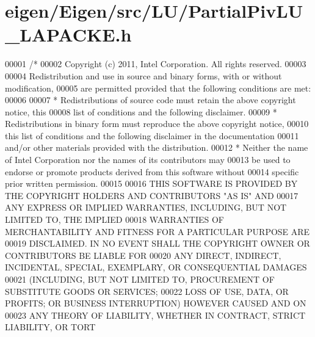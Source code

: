 \hypertarget{eigen_2_eigen_2src_2_l_u_2_partial_piv_l_u___l_a_p_a_c_k_e_8h_source}{}\section{eigen/\+Eigen/src/\+L\+U/\+Partial\+Piv\+L\+U\+\_\+\+L\+A\+P\+A\+C\+KE.h}
\label{eigen_2_eigen_2src_2_l_u_2_partial_piv_l_u___l_a_p_a_c_k_e_8h_source}

\begin{DoxyCode}
00001 \textcolor{comment}{/*}
00002 \textcolor{comment}{ Copyright (c) 2011, Intel Corporation. All rights reserved.}
00003 \textcolor{comment}{}
00004 \textcolor{comment}{ Redistribution and use in source and binary forms, with or without modification,}
00005 \textcolor{comment}{ are permitted provided that the following conditions are met:}
00006 \textcolor{comment}{}
00007 \textcolor{comment}{ * Redistributions of source code must retain the above copyright notice, this}
00008 \textcolor{comment}{   list of conditions and the following disclaimer.}
00009 \textcolor{comment}{ * Redistributions in binary form must reproduce the above copyright notice,}
00010 \textcolor{comment}{   this list of conditions and the following disclaimer in the documentation}
00011 \textcolor{comment}{   and/or other materials provided with the distribution.}
00012 \textcolor{comment}{ * Neither the name of Intel Corporation nor the names of its contributors may}
00013 \textcolor{comment}{   be used to endorse or promote products derived from this software without}
00014 \textcolor{comment}{   specific prior written permission.}
00015 \textcolor{comment}{}
00016 \textcolor{comment}{ THIS SOFTWARE IS PROVIDED BY THE COPYRIGHT HOLDERS AND CONTRIBUTORS "AS IS" AND}
00017 \textcolor{comment}{ ANY EXPRESS OR IMPLIED WARRANTIES, INCLUDING, BUT NOT LIMITED TO, THE IMPLIED}
00018 \textcolor{comment}{ WARRANTIES OF MERCHANTABILITY AND FITNESS FOR A PARTICULAR PURPOSE ARE}
00019 \textcolor{comment}{ DISCLAIMED. IN NO EVENT SHALL THE COPYRIGHT OWNER OR CONTRIBUTORS BE LIABLE FOR}
00020 \textcolor{comment}{ ANY DIRECT, INDIRECT, INCIDENTAL, SPECIAL, EXEMPLARY, OR CONSEQUENTIAL DAMAGES}
00021 \textcolor{comment}{ (INCLUDING, BUT NOT LIMITED TO, PROCUREMENT OF SUBSTITUTE GOODS OR SERVICES;}
00022 \textcolor{comment}{ LOSS OF USE, DATA, OR PROFITS; OR BUSINESS INTERRUPTION) HOWEVER CAUSED AND ON}
00023 \textcolor{comment}{ ANY THEORY OF LIABILITY, WHETHER IN CONTRACT, STRICT LIABILITY, OR TORT}

\end{DoxyCode}

